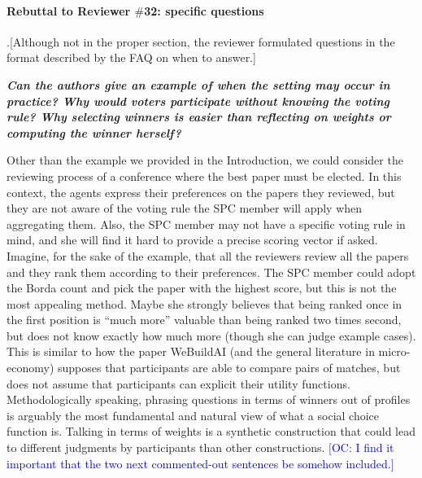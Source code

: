 \documentclass{article}
\newcommand{\commentOC}[1]{\textcolor{blue}{\small$\big[$OC: #1$\big]$}}
\begin{document}
\paragraph{Rebuttal to Reviewer $\#$32: specific questions}
.[Although not in the proper section, the reviewer formulated questions in the format described by the FAQ on when to answer.]

\textit{\textbf{Can the authors give an example of when the setting may occur in practice? Why would voters participate without knowing the voting rule? Why selecting winners is easier than reflecting on weights or computing the winner herself?}}

Other than the example we provided in the Introduction, we could consider the reviewing process of a conference where the best paper must be elected. In this context, the agents express their preferences on the papers they reviewed, but they are not aware of the voting rule the SPC member will apply when aggregating them. %
Also, the SPC member may not have a specific voting rule in mind, and she will find it hard to provide a precise scoring vector if asked. Imagine, for the sake of the example, that all the reviewers review all the papers and they rank them according to their preferences. The SPC member could adopt the Borda count and pick the paper with the highest score, but this is not the most appealing method. Maybe she strongly believes that being ranked once in the first position is “much more” valuable than being ranked two times second, but does not know exactly how much more (though she can judge example cases). This is similar to how the paper WeBuildAI (and the general literature in micro-economy) supposes that participants are able to compare pairs of matches, but does not assume that participants can explicit their utility functions. Methodologically speaking, phrasing questions in terms of winners out of profiles is arguably the most fundamental and natural view of what a social choice function is. Talking in terms of weights is a synthetic construction that could lead to different judgments by participants than other constructions. \commentOC{I find it important that the two next commented-out sentences be somehow included.}
\end{document}
